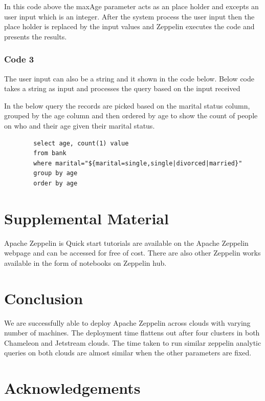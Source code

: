 \documentclass[9pt,twocolumn,twoside]{../../styles/osajnl}
\begin{document}
	In this code above the maxAge parameter acts as an place holder 
	and excepts an user input which is an integer. After the system 
	process the user input then the place holder is replaced by the 
	input values and Zeppelin executes the code and presents the 
	results.
	
	\subsubsection{Code 3}
	
	The user input can also be a string and it shown in the code 
	below. Below code takes a string as input and processes the 
	query based on the input received 
	
	In the below query the records are picked based on the marital 
	status column, grouped by the age column and then ordered by age 
	to show the count of people on who and their age given their 
	marital status.
	
	\begin{verbatim}
		select age, count(1) value 
		from bank 
		where marital="${marital=single,single|divorced|married}" 
		group by age 
		order by age
	\end{verbatim}
	
	\section{Supplemental Material}
	
	Apache Zeppelin is Quick start tutorials are available on the 
	Apache Zeppelin webpage\cite{www-tutorial1} and can be accessed 
	for free of cost. There are also other Zeppelin works available 
	in the form of notebooks on Zeppelin hub\cite{www-zhub}.
	
	\section{Conclusion}
	
	We are successfully able to deploy Apache Zeppelin across clouds 
	with varying number of machines. The deployment time flattens out 
	after four clusters in both Chameleon and Jetstream clouds. The 
	time 
	taken to run similar zeppelin  analytic queries on both clouds 
	are 
	almost 
	similar 
	when the other parameters are fixed. 
	
	\section*{Acknowledgements}
	
\end{document}
